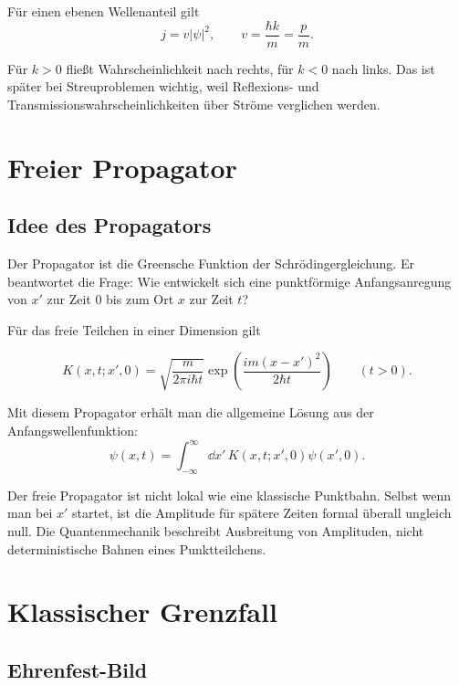 \begin{formulabox}
Für einen ebenen Wellenanteil gilt
\[
    j=v|\psi|^2,
    \qquad
    v=\frac{\hbar k}{m}=\frac{p}{m}.
\]
\end{formulabox}

\begin{notebox}
Für $k>0$ fließt Wahrscheinlichkeit nach rechts, für $k<0$ nach links. Das ist später bei Streuproblemen wichtig, weil Reflexions- und Transmissionswahrscheinlichkeiten über Ströme verglichen werden.
\end{notebox}

\section{Freier Propagator}

\subsection{Idee des Propagators}

Der Propagator ist die Greensche Funktion der Schrödingergleichung. Er beantwortet die Frage: Wie entwickelt sich eine punktförmige Anfangsanregung von $x'$ zur Zeit $0$ bis zum Ort $x$ zur Zeit $t$?

Für das freie Teilchen in einer Dimension gilt
\begin{formulabox}
\[
    K(x,t;x',0)
    =\sqrt{\frac{m}{2\pi i\hbar t}}
    \exp\left(\frac{im(x-x')^2}{2\hbar t}\right)
    \qquad (t>0).
\]
\end{formulabox}

Mit diesem Propagator erhält man die allgemeine Lösung aus der Anfangswellenfunktion:
\[
    \psi(x,t)=\int_{-\infty}^{\infty}\dd x'\,
    K(x,t;x',0)\psi(x',0).
\]

\begin{notebox}
Der freie Propagator ist nicht lokal wie eine klassische Punktbahn. Selbst wenn man bei $x'$ startet, ist die Amplitude für spätere Zeiten formal überall ungleich null. Die Quantenmechanik beschreibt Ausbreitung von Amplituden, nicht deterministische Bahnen eines Punktteilchens.
\end{notebox}

\section{Klassischer Grenzfall}

\subsection{Ehrenfest-Bild}

